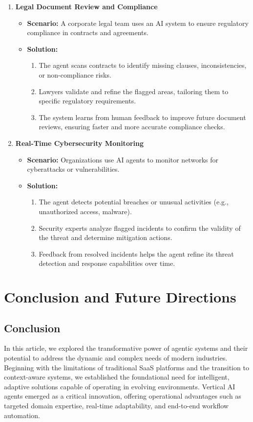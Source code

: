 \documentclass[12pt]{article}
\begin{document}
\begin{enumerate}
    \item \textbf{Legal Document Review and Compliance}
    \begin{itemize}
        \item \textbf{Scenario:} A corporate legal team uses an AI system to ensure regulatory compliance in contracts and agreements.
        \item \textbf{Solution:}
        \begin{enumerate}
            \item The agent scans contracts to identify missing clauses, inconsistencies, or non-compliance risks.
            \item Lawyers validate and refine the flagged areas, tailoring them to specific regulatory requirements.
            \item The system learns from human feedback to improve future document reviews, ensuring faster and more accurate compliance checks.
        \end{enumerate}
    \end{itemize}
    \item \textbf{Real-Time Cybersecurity Monitoring}
    \begin{itemize}
        \item \textbf{Scenario:} Organizations use AI agents to monitor networks for cyberattacks or vulnerabilities.
        \item \textbf{Solution:}
        \begin{enumerate}
            \item The agent detects potential breaches or unusual activities (e.g., unauthorized access, malware).
            \item Security experts analyze flagged incidents to confirm the validity of the threat and determine mitigation actions.
            \item Feedback from resolved incidents helps the agent refine its threat detection and response capabilities over time.
        \end{enumerate}
    \end{itemize}
\end{enumerate}

\newpage
\section{Conclusion and Future Directions}

\subsection{Conclusion}
In this article, we explored the transformative power of agentic systems and their potential to address the dynamic and complex needs of modern industries. Beginning with the limitations of traditional SaaS platforms and the transition to context-aware systems, we established the foundational need for intelligent, adaptive solutions capable of operating in evolving environments. Vertical AI agents emerged as a critical innovation, offering operational advantages such as targeted domain expertise, real-time adaptability, and end-to-end workflow automation.
\end{document}
